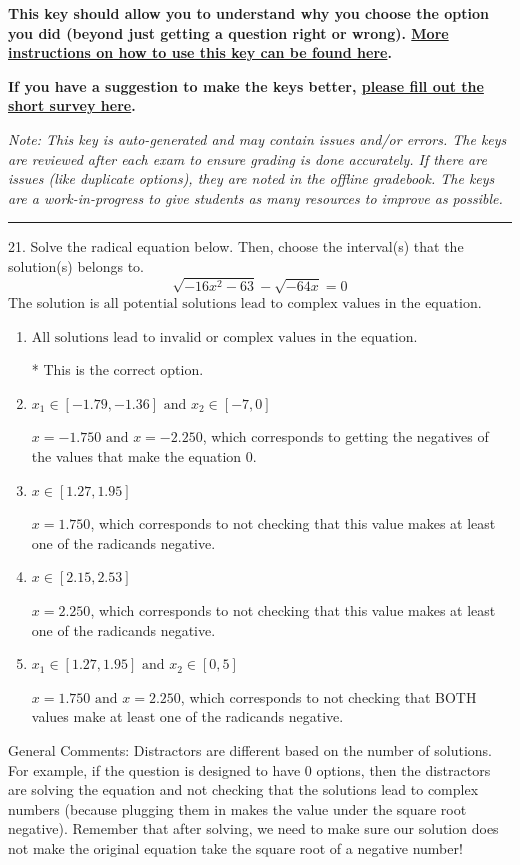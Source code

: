\documentclass{extbook}[14pt]
\begin{document}
\textbf{This key should allow you to understand why you choose the option you did (beyond just getting a question right or wrong). \href{https://xronos.clas.ufl.edu/mac1105spring2020/courseDescriptionAndMisc/Exams/LearningFromResults}{More instructions on how to use this key can be found here}.}

\textbf{If you have a suggestion to make the keys better, \href{https://forms.gle/CZkbZmPbC9XALEE88}{please fill out the short survey here}.}

\textit{Note: This key is auto-generated and may contain issues and/or errors. The keys are reviewed after each exam to ensure grading is done accurately. If there are issues (like duplicate options), they are noted in the offline gradebook. The keys are a work-in-progress to give students as many resources to improve as possible.}

\rule{\textwidth}{0.4pt}

21. Solve the radical equation below. Then, choose the interval(s) that the solution(s) belongs to.
\[ \sqrt{-16 x^2 - 63} - \sqrt{-64 x} = 0 \] 
The solution is $ \text{all potential solutions lead to complex values in the equation.} $ 

\begin{enumerate}[label=\Alph*.] 
\item $ \text{All solutions lead to invalid or complex values in the equation.} $ 

 * This is the correct option. 
\item $ x_1 \in [-1.79, -1.36] \text{ and } x_2 \in [-7,0] $ 

 $x = -1.750 \text{ and } x = -2.250$, which corresponds to getting the negatives of the values that make the equation 0. 
\item $ x \in [1.27,1.95] $ 

 $x = 1.750$, which corresponds to not checking that this value makes at least one of the radicands negative. 
\item $ x \in [2.15,2.53] $ 

 $x = 2.250$, which corresponds to not checking that this value makes at least one of the radicands negative. 
\item $ x_1 \in [1.27, 1.95] \text{ and } x_2 \in [0,5] $ 

 $x = 1.750 \text{ and } x = 2.250$, which corresponds to not checking that BOTH values make at least one of the radicands negative. 
\end{enumerate} 
 
General Comments: Distractors are different based on the number of solutions. For example, if the question is designed to have 0 options, then the distractors are solving the equation and not checking that the solutions lead to complex numbers (because plugging them in makes the value under the square root negative). Remember that after solving, we need to make sure our solution does not make the original equation take the square root of a negative number!
\end{document}
